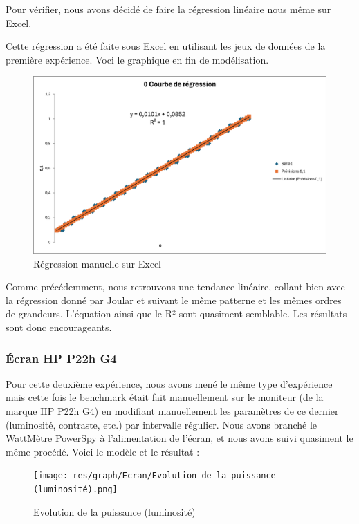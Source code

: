 \documentclass[12pt, a4paper]{report}
\begin{document}
Pour vérifier, nous avons décidé de faire la régression linéaire nous même sur Excel.

Cette régression a été faite sous Excel en utilisant les jeux de données de la première expérience. Voci le graphique en fin de modélisation.
\begin{figure}[H]
    \includegraphics[width=1\linewidth]{res/graph/RPi/regman.png}
    \caption{Régression manuelle sur Excel}
    \label{fig:reg_man}
\end{figure}
Comme précédemment, nous retrouvons une tendance linéaire, collant bien avec la régression donné par Joular et suivant le même patterne et les mêmes ordres de grandeurs. 
L'équation ainsi que le R² sont quasiment semblable. Les résultats sont donc encourageants.

\subsubsection{Écran HP P22h G4}
Pour cette deuxième expérience, nous avons mené le même type d'expérience mais cette fois le benchmark était fait manuellement sur le moniteur (de la marque HP P22h G4) en modifiant manuellement les paramètres de ce dernier (luminosité, contraste, etc.) par intervalle régulier. Nous avons branché le WattMètre PowerSpy à l'alimentation de l'écran, et nous avons suivi quasiment le même procédé.
Voici le modèle et le résultat :

\begin{figure}[H]
    \texttt{[image: res/graph/Ecran/Evolution de la puissance (luminosité).png]}
    \caption{Evolution de la puissance (luminosité)}
    \label{fig:evolution-puis}
\end{figure}
\end{document}
